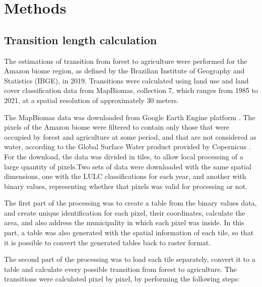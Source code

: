 \documentclass[essd, manuscript]{copernicus}
\begin{document}
\section{Methods}

\subsection{Transition length calculation}

The estimations of transition from forest to agriculture were performed for the Amazon biome region, as defined by the Brazilian Institute of Geography and Statistics (IBGE), in 2019.
Transitions were calculated using land use and land cover classification data from MapBiomas, collection 7, which ranges from 1985 to 2021, at a spatial resolution of approximately 30 meters.

The MapBiomas data was downloaded from Google Earth Engine platform \citep{Gorelick2017}.
The pixels of the Amazon biome were filtered to contain only those that were occupied by forest and agriculture at some period, and that are not considered as water, according to the Global Surface Water product provided by Copernicus \citep{Pekel2016}.
For the download, the data was divided in tiles, to allow local processing of a large quantity of pixels.Two sets of data were downloaded with the same spatial dimensions, one with the LULC classifications for each year, and another with binary values, representing whether that pixels was valid for processing or not.

The first part of the processing was to create a table from the binary values data, and create unique identification for each pixel, their coordinates, calculate the area, and also address the municipality in which each pixel was inside.
In this part, a table was also generated with the spatial information of each tile, so that it is possible to convert the generated tables back to raster format.

The second part of the processing was to load each tile separately, convert it to a table and calculate every possible transition from forest to agriculture.
The transitions were calculated pixel by pixel, by performing the following steps:
\end{document}
